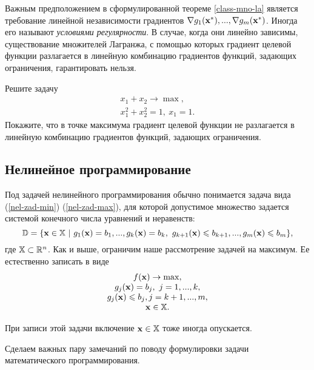     Важным предположением в сформулированной теореме \ref{class-mno-la} является
    требование линейной независимости градиентов
    $\nabla g_{1}(\mathbf{x^{*}}),...,\nabla g_{m}(\mathbf{x^{*}})$. Иногда
    его называют \emph{условиями регулярности}.
    В случае, когда они линейно зависимы, существование множителей
    Лагранжа, с помощью которых градиент целевой функции разлагается
    в линейную комбинацию градиентов функций, задающих ограничения,
    гарантировать нельзя.
\begin{exer}
    Решите задачу
\begin{equation}
    \begin{array}{c}
      x_{1}+x_{2}\rightarrow\max, \\
      x_{1}^{2}+x_{2}^{2}=1, \ x_{1}=1.
    \end{array}
\end{equation}
    Покажите, что в точке максимума градиент целевой функции не
    разлагается в линейную комбинацию градиентов функций, задающих
    ограничения.
\end{exer}



\subsection{Нелинейное программирование}

    Под задачей нелинейного программирования обычно понимается задача
    вида (\ref{nel-zad-min})
    (\ref{nel-zad-max}), для которой допустимое множество задается
    системой конечного числа уравнений и неравенств:
    \[\st{D}=\{\vc{x}\in\st{X} \ | \ g_{1}(\vc{x})=b_{1},...,g_{k}(\vc{x})=b_{k}, \
    g_{k+1}(\vc{x})\leqslant b_{k+1},...,g_{m}(\vc{x})\leqslant b_{m}\},\]
    где $\mathbb{X}\subset\mathbb{R}^{n}$.
    Как и выше, ограничим наше рассмотрение задачей на максимум.
    Ее естественно записать в виде
\begin{equation}
\label{zad-np-rav-ner}
\begin{array}{c}
  f(\mathbf{x})\rightarrow\max, \\
  g_{j}(\mathbf{x})=b_{j}, \ j=1,...,k, \\
  g_{j}(\mathbf{x})\leqslant b_{j}, j=k+1,...,m, \\
  \mathbf{x}\in\mathbb{X}.
\end{array}
\end{equation}

    При записи этой задачи включение $\mathbf{x}\in\mathbb{X}$ тоже иногда
    опускается.

    Сделаем важных пару замечаний по поводу формулировки задачи
    математического программирования.

